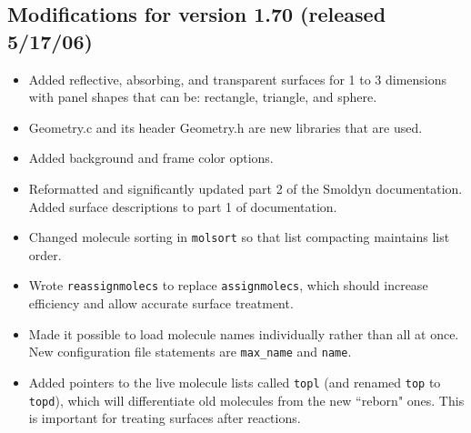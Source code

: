\documentclass {scrbook}
\newcommand {\ttt} {\texttt}
\begin{document}
\subsection{Modifications for version 1.70 (released 5/17/06)}
\begin{itemize}
\item Added reflective, absorbing, and transparent surfaces for 1 to 3 dimensions with panel shapes that can be: rectangle, triangle, and sphere.
\item Geometry.c and its header Geometry.h are new libraries that are used.
\item Added background and frame color options.
\item Reformatted and significantly updated part 2 of the Smoldyn documentation. Added surface descriptions to part 1 of documentation.
\item Changed molecule sorting in \ttt{molsort} so that list compacting maintains list order.
\item Wrote \ttt{reassignmolecs} to replace \ttt{assignmolecs}, which should increase efficiency and allow accurate surface treatment.
\item Made it possible to load molecule names individually rather than all at once. New configuration file statements are \ttt{max\_name} and \ttt{name}.
\item Added pointers to the live molecule lists called \ttt{topl} (and renamed \ttt{top} to \ttt{topd}), which will differentiate old molecules from the new ``reborn" ones. This is important for treating surfaces after reactions.
\end{itemize}
\end{document}
